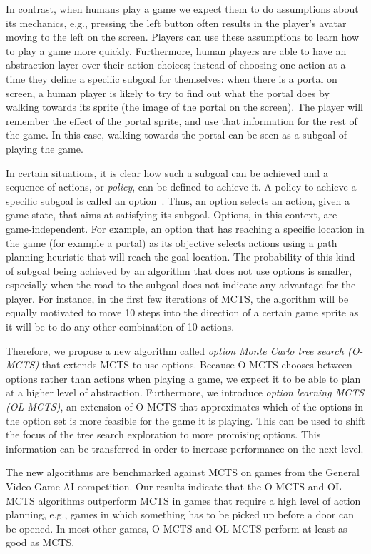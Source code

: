 In contrast, when humans play a game we expect them to do assumptions about its
mechanics, e.g., pressing the left button often results in the player's avatar
moving to the left on the screen. Players can use these assumptions to learn how
to play a game more quickly. Furthermore, human players are able to have an
abstraction layer over their action choices; instead of choosing one action at a
time they define a specific subgoal for themselves: when there is a portal on
screen, a human player is likely to try to find out what the portal does by
walking towards its sprite (the image of the portal on the screen). The player
will remember the effect of the portal sprite, and use that information for the
rest of the game. In this case, walking towards the portal can be seen as a
subgoal of playing the game.

In certain situations, it is clear how such a subgoal can be achieved and a
sequence of actions, or \emph{policy}, can be defined to achieve it. A policy to
achieve a specific subgoal is called an option~\cite{sutton1999between}. Thus,
an option selects an action, given a game state, that aims at satisfying its
subgoal. Options, in this context, are game-independent. For example, an option
that has reaching a specific location in the game (for example a portal) as its
objective selects actions using a path planning heuristic that will reach the
goal location.  The probability of this kind of subgoal being achieved by an
algorithm that does not use options is smaller, especially when the road to the
subgoal does not indicate any advantage for the player. For instance, in the
first few iterations of MCTS, the algorithm will be equally motivated to move 10
steps into the direction of a certain game sprite as it will be to do any other
combination of 10 actions. 

Therefore, we propose a new algorithm called \emph{option Monte Carlo tree
search (O-MCTS)} that extends MCTS to use options. Because O-MCTS chooses
between options rather than actions when playing a game, we expect it to be able
to plan at a higher level of abstraction. Furthermore, we introduce \emph{option
learning MCTS (OL-MCTS)}, an extension of O-MCTS that approximates which of the
options in the option set is more feasible for the game it is playing. This can
be used to shift the focus of the tree search exploration to more promising
options. This information can be transferred in order to increase performance on
the next level.

The new algorithms are benchmarked against MCTS on games from the General Video
Game AI competition. Our results indicate that the O-MCTS and OL-MCTS algorithms
outperform MCTS in games that require a high level of action planning, e.g.,
games in which something has to be picked up before a door can be opened. In
most other games, O-MCTS and OL-MCTS perform at least as good as MCTS\@.
